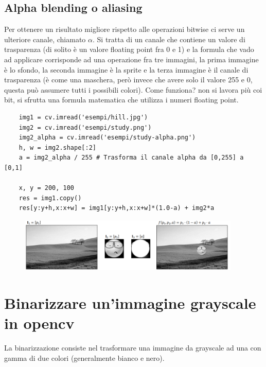 \subsection{Alpha blending o aliasing}

Per ottenere un risultato migliore rispetto alle operazioni bitwise ci serve un ulteriore canale, chiamato $\alpha$. Si tratta di un canale che contiene un valore di trasparenza (di solito è un valore floating point fra 0 e 1) e la formula che vado ad applicare corrisponde ad una operazione fra tre immagini, la prima immagine è lo sfondo, la seconda immagine è la sprite e la terza immagine è il canale di trasparenza (è come una maschera, però invece che avere solo il valore 255 e 0, questa può assumere tutti i possibili colori). Come funziona? non si lavora più coi bit, si sfrutta una formula matematica che utilizza i numeri floating point. 

\begin{lstlisting}
	img1 = cv.imread('esempi/hill.jpg')
	img2 = cv.imread('esempi/study.png')
	img2_alpha = cv.imread('esempi/study-alpha.png')
	h, w = img2.shape[:2]
	a = img2_alpha / 255 # Trasforma il canale alpha da [0,255] a [0,1]
	
	x, y = 200, 100
	res = img1.copy()
	res[y:y+h,x:x+w] = img1[y:y+h,x:x+w]*(1.0-a) + img2*a
\end{lstlisting}

\begin{figure}[htp]
	\includegraphics[width=300pt]{./immagini/alpha_blending.png}
	\label{img:alpha_blending}
\end{figure}

\newpage

\section{Binarizzare un'immagine grayscale in opencv}

La binarizzazione consiste nel trasformare una immagine da grayscale ad una con gamma di due colori (generalmente bianco e nero).

